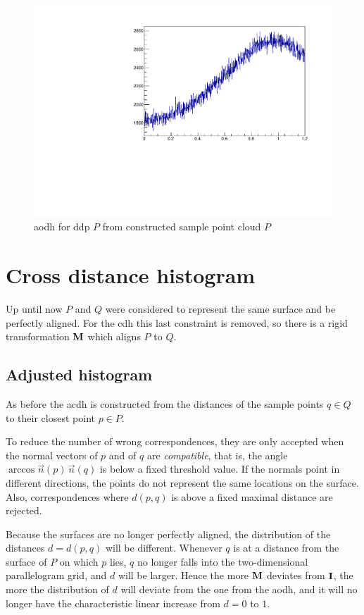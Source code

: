 \begin{figure}[h]
\centering
\includegraphics[width=.5\textwidth]{fig/ddp_adj.pdf}
\caption{\Gls{aodh} for \gls{ddp} $P$ from constructed sample point cloud $P$}
\label{fig:ddp_adj}
\end{figure}

\FloatBarrier

\newpage

\section{Cross distance histogram}
Up until now $P$ and $Q$ were considered to represent the same surface and be perfectly aligned. For the \gls{cdh} this last constraint is removed, so there is a rigid transformation $\mathbf{M}$ which aligns $P$ to $Q$.


\subsection{Adjusted histogram}
As before the \gls{acdh} is constructed from the distances of the sample points $q \in Q$ to their closest point $p \in P$.

To reduce the number of wrong correspondences, they are only accepted when the normal vectors of $p$ and of $q$ are \emph{compatible}, that is, the angle $\arccos \vec{n}(p) \, \vec{n}(q)$ is below a fixed threshold value. If the normals point in different directions, the points do not represent the same locations on the surface. Also, correspondences where $d(p, q)$ is above a fixed maximal distance are rejected.

Because the surfaces are no longer perfectly aligned, the distribution of the distances $d = d(p, q)$ will be different. Whenever $q$ is at a distance from the surface of $P$ on which $p$ lies, $q$ no longer falls into the two-dimensional parallelogram grid, and $d$ will be larger. Hence the more $\mathbf{M}$ deviates from $\mathbf{I}$, the more the distribution of $d$ will deviate from the one from the \gls{aodh}, and it will no longer have the characteristic linear increase from $d = 0$ to $1$.


